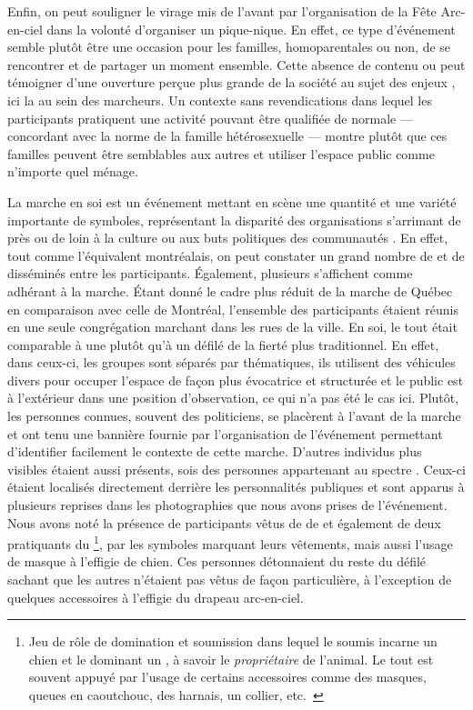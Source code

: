 Enfin, on peut souligner le virage  mis de l'avant par l'organisation de la Fête Arc-en-ciel dans la volonté d'organiser un pique-nique.
En effet, ce type d'événement semble plutôt être une occasion pour les familles, homoparentales ou non, de se rencontrer et de partager un moment ensemble.
Cette absence de contenu  ou  peut témoigner d'une ouverture perçue plus grande de la société au sujet des enjeux \lgbt, ici la  au sein des marcheurs.
Un contexte sans revendications dans lequel les participants pratiquent une activité pouvant être qualifiée de normale --- concordant avec la norme de la famille hétérosexuelle --- montre plutôt que ces familles peuvent être semblables aux autres et utiliser l'espace public comme n'importe quel ménage.

La marche en soi est un événement mettant en scène une quantité et une variété importante de symboles, représentant la disparité des organisations s'arrimant de près ou de loin à la culture ou aux buts politiques des communautés \lgbt.
En effet, tout comme l'équivalent montréalais, on peut constater un grand nombre de  et de  disséminés entre les participants.
Également, plusieurs  s'affichent comme adhérant à la marche.
Étant donné le cadre plus réduit de la marche de Québec en comparaison avec celle de Montréal, l'ensemble des participants étaient réunis en une seule congrégation marchant dans les rues de la ville.
En soi, le tout était comparable à une  plutôt qu'à un défilé de la fierté plus traditionnel.
En effet, dans ceux-ci, les groupes sont séparés par thématiques, ils utilisent des véhicules divers pour occuper l'espace de façon plus évocatrice et structurée et le public est à l'extérieur dans une position d'observation, ce qui n'a pas été le cas ici.
Plutôt, les personnes connues, souvent des politiciens, se placèrent à l'avant de la marche et ont tenu une bannière fournie par l'organisation de l'événement permettant d'identifier facilement le contexte de cette marche.
D'autres individus plus visibles étaient aussi présents, sois des personnes appartenant au spectre \bdsm{}.
Ceux-ci étaient localisés directement derrière les personnalités publiques et sont apparus à plusieurs reprises dans les photographies que nous avons prises de l'événement.
Nous avons noté la présence de participants vêtus de  de  et également de deux pratiquants du \footnote{Jeu de rôle de domination et soumission dans lequel le soumis incarne un chien et le dominant un , à savoir le \emph{propriétaire} de l'animal.
Le tout est souvent appuyé par l'usage de certains accessoires comme des masques, queues en caoutchouc, des harnais, un collier, etc.~\citep[voir][5]{Wignall2015}}, par les symboles marquant leurs vêtements, mais aussi l'usage de masque à l'effigie de chien.
Ces personnes détonnaient du reste du défilé sachant que les autres n'étaient pas vêtus de façon particulière, à l'exception de quelques accessoires à l'effigie du drapeau arc-en-ciel.

